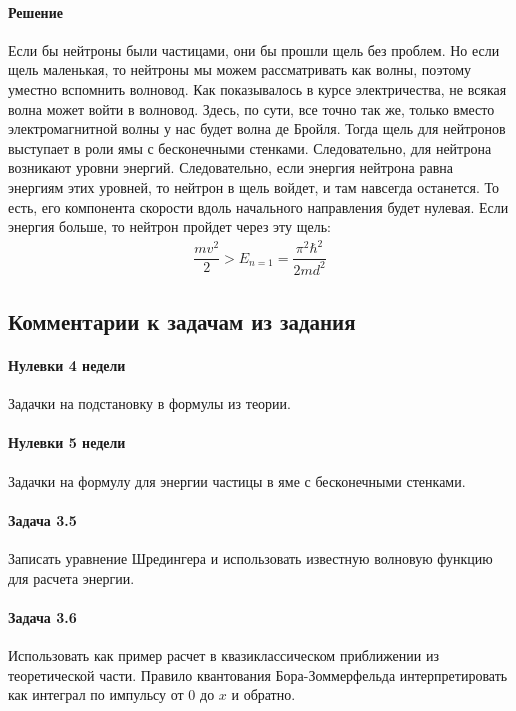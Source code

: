 \documentclass[12pt]{article}
\begin{document}
\paragraph{Решение}
Если бы нейтроны были частицами, они бы прошли щель без проблем. Но если щель маленькая, то нейтроны мы можем рассматривать как волны, поэтому уместно вспомнить волновод. Как показывалось в курсе электричества, не всякая волна может войти в волновод. Здесь, по сути, все точно так же, только вместо электромагнитной волны у нас будет волна де Бройля. Тогда щель для нейтронов выступает в роли ямы с бесконечными стенками. Следовательно, для нейтрона возникают уровни энергий. Следовательно, если энергия нейтрона равна энергиям этих уровней, то нейтрон в щель войдет, и там навсегда останется. То есть, его компонента скорости вдоль начального направления будет нулевая. Если энергия больше, то нейтрон пройдет через эту щель:
\begin{gather*}
    \dfrac{mv^2}{2} > E_{n=1} = \dfrac{\pi^2\hbar^2}{2md^2}
\end{gather*}

\subsection{Комментарии к задачам из задания}
\paragraph{Нулевки 4 недели} Задачки на подстановку в формулы из теории.

\paragraph{Нулевки 5 недели} Задачки на формулу для энергии частицы в яме с бесконечными стенками.

\paragraph{Задача 3.5} Записать уравнение Шредингера и использовать известную волновую функцию для расчета энергии.

\paragraph{Задача 3.6} Использовать как пример расчет в квазиклассическом приближении из теоретической части. Правило квантования Бора-Зоммерфельда интерпретировать как интеграл по импульсу от 0 до $x$ и обратно.
\end{document}

